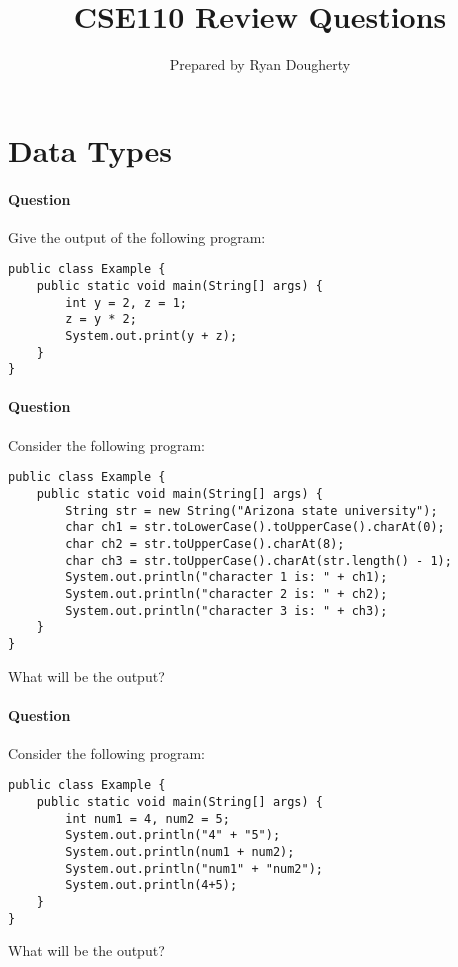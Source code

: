 \documentclass{article}
\title{CSE110 Review Questions}
\author{Prepared by Ryan Dougherty}
\date{}
\begin{document}
\maketitle

\setcounter{question_num}{1}

\section{Data Types}

\setcounter{question_num}{1}
\paragraph{Question }
Give the output of the following program:
\begin{lstlisting}
public class Example {
	public static void main(String[] args) {
		int y = 2, z = 1;
		z = y * 2;
		System.out.print(y + z);
	}
}
\end{lstlisting}

\addtocounter{question_num}{1}
\paragraph{Question }
Consider the following program:
\begin{lstlisting}
public class Example {
	public static void main(String[] args) {
		String str = new String("Arizona state university");
		char ch1 = str.toLowerCase().toUpperCase().charAt(0);
		char ch2 = str.toUpperCase().charAt(8);
		char ch3 = str.toUpperCase().charAt(str.length() - 1);
		System.out.println("character 1 is: " + ch1);
		System.out.println("character 2 is: " + ch2);
		System.out.println("character 3 is: " + ch3);
	}
}
\end{lstlisting}
What will be the output?

\addtocounter{question_num}{1}
\paragraph{Question }
Consider the following program:
\begin{lstlisting}
public class Example {
	public static void main(String[] args) {
		int num1 = 4, num2 = 5;
		System.out.println("4" + "5");
		System.out.println(num1 + num2);
		System.out.println("num1" + "num2");
		System.out.println(4+5);
	}
}
\end{lstlisting}
What will be the output?
\end{document}
